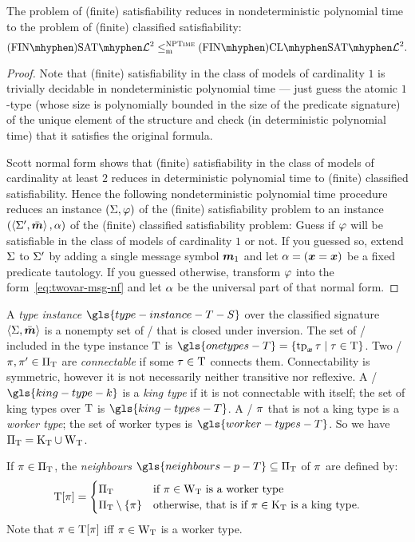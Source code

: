 \begin{remark}
The problem of (finite) satisfiability reduces in nondeterministic polynomial
time to the problem of (finite) classified satisfiability:
\[
  \FinASat{\vFo2} \red\cNP \FinAClSat{\vFo2}.
\]
\end{remark}
\begin{proof}

Note that (finite) satisfiability in the class of models of cardinality $1$ is
trivially decidable in nondeterministic polynomial time --- just guess the
atomic $1$-type (whose size is polynomially bounded in the size of the
predicate signature) of the unique element of the structure and check (in
deterministic polynomial time) that it satisfies the original formula.

Scott normal form shows that (finite) satisfiability in the class of models of
cardinality at least $2$ reduces in deterministic polynomial time to (finite)
classified satisfiability.
Hence the following nondeterministic polynomial time procedure reduces an
instance $(\mathrm{\Sigma}, \varphi)$ of the (finite) satisfiability problem to an instance
$(\left\langle \mathrm{\Sigma'},\bar{\bm{m}} \right\rangle, \alpha)$ of the (finite) classified satisfiability problem:
Guess if $\varphi$ will be satisfiable in the class of models of cardinality
$1$ or not.
If you guessed so, extend $\mathrm{\Sigma}$ to $\mathrm{\Sigma'}$ by adding a single message
symbol $\bm{m}_{1}$ and let $\alpha = (\bm{x} = \bm{x})$ be a fixed predicate tautology.
If you guessed otherwise, transform $\varphi$ into the
form~\cref{eq:twovar-msg-nf} and let $\alpha$ be the universal part of that
normal form.
\end{proof}

A \emph{type instance} $\gls{type-instance-T-S}$ over the classified signature
$\left\langle \mathrm{\Sigma},\bar{\bm{m}} \right\rangle$ is a nonempty set of \twotypes/ that is closed under
inversion.
The set of \onetypes/ included in the type instance $\mathrm{T}$ is
$\gls{onetypes-T} = \setbd{\xtp\tpt}{\tpt\in\TI}$.
Two \onetypes/ $\pi,{\pi'} \in {\Pi}_{\mathrm{T}}$ are \emph{connectable} if some
$\tau\in\mathrm{T}$ connects them.
Connectability is symmetric, however it is not necessarily neither transitive
nor reflexive.
A \onetype/ $\gls{king-type-k}$ is a \emph{king type} if it is not connectable
with itself; the set of king types over $\mathrm{T}$ is $\gls{king-types-T}$.
A \onetype/ $\pi$ that is not a king type is a \emph{worker type};
the set of worker types is $\gls{worker-types-T}$.
So we have ${\Pi}_{\mathrm{T}} = {\mathrm{K}}_{\mathrm{T}} \cup {\mathrm{W}}_{\mathrm{T}}$.

If $\pi\in{\Pi}_{\mathrm{T}}$, the \emph{neighbours} $\gls{neighbours-p-T} \subseteq\TP\TI$
of $\pi$ are defined by:
\[
  \mathrm{T}[\pi] = \begin{cases}
    {\Pi}_{\mathrm{T}} &\text{if } \pi\in{\mathrm{W}}_{\mathrm{T}} \text{ is a worker type} \\
    {\Pi}_{\mathrm{T}} \setminus \left\{\pi\right\} &\text{otherwise, that is if }
    \pi\in{\mathrm{K}}_{\mathrm{T}} \text{ is a king type.}
  \end{cases}
\]
Note that $\pi \in \mathrm{T}[\pi]$ iff $\pi \in {\mathrm{W}}_{\mathrm{T}}$ is a worker type.


